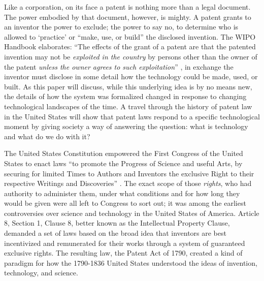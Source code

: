 \documentclass[pdftex,11pt,letterpaper]{article}
\begin{document}
Like a corporation, on its face a patent is nothing more than a legal document. The power embodied by that document, however, is mighty. A patent grants to an inventor the power to exclude; the power to say no, to determine who is allowed to `practice' or ``make, use, or build'' the disclosed invention. The WIPO Handbook elaborates: ``The effects of the grant of a patent are that the patented invention may not be \emph{exploited in the country} by persons other than the owner of the patent \emph{unless the owner agrees to such exploitation}'' \autocite[emphasis added]{WIPO}, in exchange the inventor must disclose in some detail how the technology could be made, used, or built. As this paper will discuss, while this underlying idea is by no means new, the details of how the system was formalized changed in response to changing technological landscapes of the time. A travel through the history of patent law in the United States will show that patent laws respond to a specific technological moment by giving society a way of answering the question: what is technology and what do we do with it?

The United States Constitution empowered the First Congress of the United States to enact laws ``to promote the Progress of Science and useful Arts, by securing for limited Times to Authors and Inventors the exclusive Right to their respective Writings and Discoveries'' \autocite[Art. 1, \S 8, Cl. 8.]{USConstitution}. The exact scope of those \textit{rights}, who had authority to administer them, under what conditions and for how long they would be given were all left to Congress to sort out; it was among the earliest controversies over science and technology in the United States of America. Article 8, Section 1, Clause 8, better known as the Intellectual Property Clause, demanded a set of laws based on the broad idea that inventors are best incentivized and remunerated for their works through a system of guaranteed exclusive rights. The resulting law, the Patent Act of 1790, created a kind of paradigm for how the 1790-1836 United States understood the ideas of invention, technology, and science. 
\end{document}
